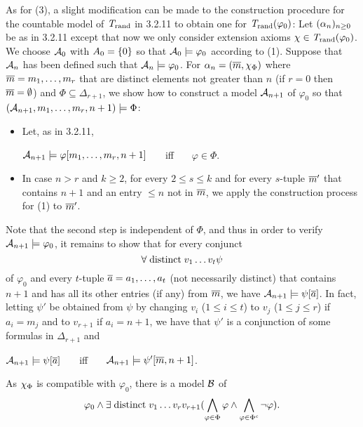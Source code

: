 \begin{enumerate}[1.]
As for (3), a slight modification can be made to the construction procedure for the countable model of $\mathit{T}_{\mathrm{rand}}$ in 3.2.11 to obtain one for $\mathit{T}_{\mathrm{rand}}(\varphi_0)$: Let $(\alpha_n)_{n \geq 0}$ be as in 3.2.11 except that now we only consider extension axioms $\extaxm \in \randstrtheory(\varphi_0)$. We choose $\mathcal{A}_0$ with $A_0 = {\{0\}}$ so that $\mathcal{A}_0 \models \varphi_0$ according to (1). Suppose that $\mathcal{A}_n$ has been defined such that $\mathcal{A}_n \models \varphi_0$. For $\alpha_n = (\vect{m}, \extaxm[\Phi])$ where $\overline{m} = m_1, \ldots, m_r$ that are distinct elements not greater than $n$ (if $r = 0$ then $\overline{m} = \emptyset$) and $\Phi \subseteq \Delta_{r + 1}$, we show how to construct a model $\mathcal{A}_{n + 1}$ of $\varphi_0$ so that $(\mathcal{A}_{n + 1}, m_1, \ldots, m_r, n + 1) \models \Phi$:
\begin{itemize}
\item Let, as in 3.2.11,
\begin{center}
$\mathcal{A}_{n + 1} \models \varphi [m_1, \ldots, m_r, n + 1]$ \ \ \ iff \ \ \ $\varphi \in \Phi$.
\end{center}
\item In case $n > r$ and $k \geq 2$, for every $2 \leq s \leq k$ and for every $s$-tuple $\overline{m}'$ that contains $n + 1$ and an entry $\leq n$ not in $\overline{m}$, we apply the construction process for (1) to $\overline{m}'$.
\end{itemize}
Note that the second step is independent of $\Phi$, and thus in order to verify $\mathcal{A}_{n + 1} \models \varphi_0$, it remains to show that for every conjunct
\[
\forall \mathrel{\mathrm{distinct}} v_1 \ldots v_t \psi
\]
of $\varphi_0$ and every $t$-tuple $\overline{a} = a_1, \ldots, a_t$ (not necessarily distinct) that contains $n + 1$ and has all its other entries (if any) from $\overline{m}$, we have $\mathcal{A}_{n + 1} \models \psi [\overline{a}]$. In fact, letting $\psi'$ be obtained from $\psi$ by changing $v_i$ ($1 \leq i \leq t$) to $v_j$ ($1 \leq j \leq r$) if $a_i = m_j$ and to $v_{r + 1}$ if $a_i = n + 1$, we have that $\psi'$ is a conjunction of some formulas in $\Delta_{r + 1}$ and
\begin{center}
$\mathcal{A}_{n + 1} \models \psi [\overline{a}]$ \ \ \ iff \ \ \ $\mathcal{A}_{n + 1} \models \psi' [\overline{m}, n + 1]$.
\end{center}
As $\extaxm[\Phi]$ is compatible with $\varphi_0$, there is a model $\mathcal{B}$ of
\[
\varphi_0 \land \exists \mathrel{\mathrm{distinct}} v_1 \ldots v_r v_{r + 1} (\bigwedge_{\varphi \in \Phi} \varphi \land \bigwedge_{\varphi \in \Phi^\mathit{c}} \neg\varphi).
\]
\end{enumerate}
